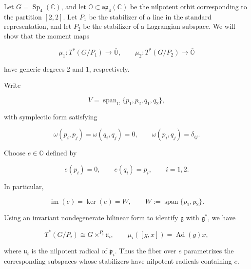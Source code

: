 
Let \(G=\operatorname{Sp}_4(\mathbb C)\), and let \(\mathbb O\subset\mathfrak{sp}_4(\mathbb C)\) be the nilpotent orbit corresponding to the partition \([2,2]\). Let \(P_1\) be the stabilizer of a line in the standard representation, and let \(P_2\) be the stabilizer of a Lagrangian subspace. We will show that the moment maps

\[
\mu_1:T^*(G/P_1)\longrightarrow\overline{\mathbb O},
\qquad
\mu_2:T^*(G/P_2)\longrightarrow\overline{\mathbb O}
\]

have generic degrees \(2\) and \(1\), respectively.

Write

\[
V=\operatorname{span}_{\mathbb C}\{p_1,p_2,q_1,q_2\},
\]

with symplectic form satisfying

\[
\omega(p_i,p_j)=\omega(q_i,q_j)=0,
\qquad
\omega(p_i,q_j)=\delta_{ij}.
\]

Choose \(e\in\mathbb O\) defined by

\[
e(p_i)=0,\qquad e(q_i)=p_i,\qquad i=1,2.
\]

In particular,

\[
\operatorname{im}(e)=\ker(e)=W,
\qquad
W:=\operatorname{span}\{p_1,p_2\}.
\]

Using an invariant nondegenerate bilinear form to identify \(\mathfrak g\) with \(\mathfrak g^*\), we have

\[
T^*(G/P_i)\cong G\times^{P_i}\mathfrak u_i,
\qquad
\mu_i([g,x])=\operatorname{Ad}(g)x,
\]

where \(\mathfrak u_i\) is the nilpotent radical of \(\mathfrak p_i\). Thus the fiber over \(e\) parametrizes the corresponding subspaces whose stabilizers have nilpotent radicals containing \(e\).

